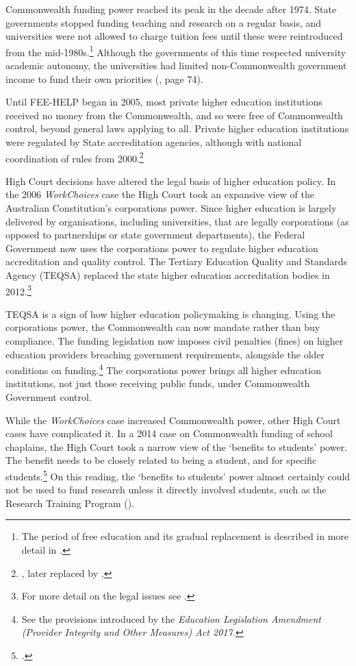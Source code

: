 \documentclass{grattan}
\begin{document}
Commonwealth funding power reached its peak in the decade after 1974. State governments stopped funding teaching and research on a regular basis, and universities were not allowed to charge tuition fees until these were reintroduced from the mid-1980s.\footnote{The period of free education and its gradual replacement is described in more detail in \textcite[][]{Norton2017howcanthegovernm}.} Although the governments of this time respected university academic autonomy, the universities had limited non-Commonwealth government income to fund their own priorities (, page 74).

Until FEE-HELP began in 2005, most private higher education institutions received no money from the Commonwealth, and so were free of Commonwealth control, beyond general laws applying to all. Private higher education institutions were regulated by State accreditation agencies, although with national coordination of rules from 2000.\footnote{\textcite[][]{MCEETYA2000nationalprotocols}, later replaced by \textcite[][]{MCEETYA2007nationalprotocols}.}

High Court decisions have altered the legal basis of higher education policy. In the 2006 \emph{WorkChoices} case the High Court took an expansive view of the Australian Constitution's corporations power. Since higher education is largely delivered by organisations, including universities, that are legally corporations (as opposed to partnerships or state government departments), the Federal Government now uses the corporations power to regulate higher education accreditation and quality control. The Tertiary Education Quality and Standards Agency (TEQSA) replaced the state higher education accreditation bodies in 2012.\footnote{For more detail on the legal issues see \textcite[][]{Williams2011commonwealthpower}.}

TEQSA is a sign of how higher education policymaking is changing. Using the corporations power, the Commonwealth can now mandate rather than buy compliance. The funding legislation now imposes civil penalties (fines) on higher education providers breaching government requirements, alongside the older conditions on funding.\footnote{See the provisions introduced by the \emph{Education Legislation Amendment (Provider Integrity and Other Measures) Act 2017.}} The corporations power brings all higher education institutions, not just those receiving public funds, under Commonwealth Government control.

While the \emph{WorkChoices} case increased Commonwealth power, other High Court cases have complicated it. In a 2014 case on Commonwealth funding of school chaplains, the High Court took a narrow view of the `benefits to students' power. The benefit needs to be closely related to being a student, and for specific students.\footcite[][]{Chordia2015williamsvcommonwe} On this reading, the `benefits to students' power almost certainly could not be used to fund research unless it directly involved students, such as the Research Training Program ().
\end{document}

